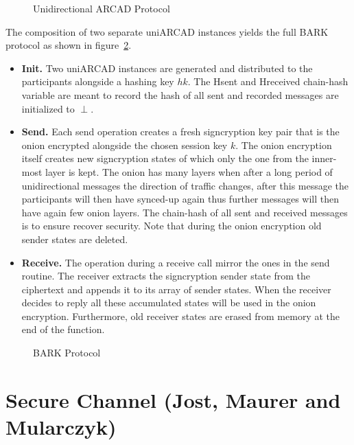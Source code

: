 \documentclass[11pt,a4paper,twoside,openright,bibliography=totoc]{scrbook}
\begin{document}
\begin{figure}[H]
  \centering
  \setlength{\fboxsep}{10pt}
  \scalebox{0.9}{%
    \fbox{%
      
    }
  }
  \caption{Unidirectional ARCAD Protocol}
  \label{fig:uni-arcad}
\end{figure}

The composition of two separate uniARCAD instances yields
the full BARK protocol as shown in figure~\ref{fig:bark}.
\begin{itemize}
\item \textbf{Init.} Two uniARCAD instances are generated and
  distributed to the participants alongside a hashing key $hk$.
  The Hsent and Hreceived chain-hash variable are meant to record
  the hash of all sent and recorded messages are initialized
  to $\perp$.
\item \textbf{Send.} Each send operation creates a fresh
  signcryption key pair that is the onion encrypted alongside
  the chosen session key $k$. The onion encryption itself
  creates new signcryption states of which only the one from
  the inner-most layer is kept. The onion has many layers when
  after a long period of unidirectional messages the direction
  of traffic changes, after this message the participants will
  then have synced-up again thus further messages will then
  have again few onion layers. The chain-hash
  of all sent and received messages is to ensure recover security.
  Note that during the onion encryption old sender states are
  deleted.
\item \textbf{Receive.} The operation during a receive call
  mirror the ones in the send routine. The receiver extracts
  the signcryption sender state from the ciphertext and appends
  it to its array of sender states. When the receiver decides
  to reply all these accumulated states will be used in the
  onion encryption. Furthermore, old receiver states are
  erased from memory at the end of the function.
\end{itemize}

\begin{figure}[p]
  \centering
  \setlength{\fboxsep}{10pt}
  \scalebox{0.9}{%
    \fbox{%
      
    } 
  }
  \caption{BARK Protocol}
  \label{fig:bark}
\end{figure}

\clearpage

\section[Secure Channel (Jost, Maurer and Mularczyk)]
{Secure Channel (Jost, Maurer and Mularczyk)~\cite{jostefficient}}
\label{sec:jost-maur-mularczyk}
\end{document}
